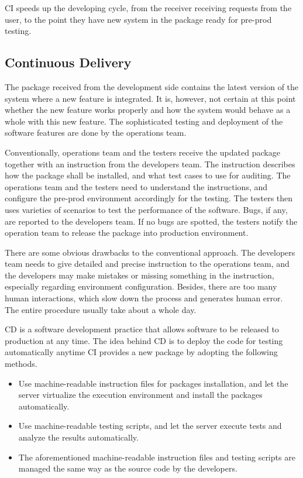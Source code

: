 CI speeds up the developing cycle, from the receiver receiving requests from the user, to the point they have new system in the package ready for pre-prod testing.

\subsection{Continuous Delivery}

The package received from the development side contains the latest version of the system where a new feature is integrated. It is, however, not certain at this point whether the new feature works properly and how the system would behave as a whole with this new feature. The sophisticated testing and deployment of the software features are done by the operations team.

Conventionally, operations team and the testers receive the updated package together with an instruction from the developers team. The instruction describes how the package shall be installed, and what test cases to use for auditing. The operations team and the testers need to understand the instructions, and configure the pre-prod environment accordingly for the testing. The testers then uses varieties of scenarios to test the performance of the software. Bugs, if any, are reported to the developers team. If no bugs are spotted, the testers notify the operation team to release the package into production environment.

There are some obvious drawbacks to the conventional approach. The developers team needs to give detailed and precise instruction to the operations team, and the developers may make mistakes or missing something in the instruction, especially regarding environment configuration. Besides, there are too many human interactions, which slow down the process and generates human error. The entire procedure usually take about a whole day.

CD is a software development practice that allows software to be released to production at any time. The idea behind CD is to deploy the code for testing automatically anytime CI provides a new package by adopting the following methods.
\begin{itemize}
  \item Use machine-readable instruction files for packages installation, and let the server virtualize the execution environment and install the packages automatically.
  \item Use machine-readable testing scripts, and let the server execute tests and analyze the results automatically.
  \item The aforementioned machine-readable instruction files and testing scripts are managed the same way as the source code by the developers.
\end{itemize}

